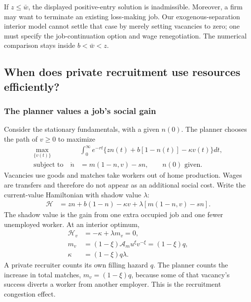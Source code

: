 If $z\leq\bar w$, the displayed positive-entry solution is inadmissible.
Moreover, a firm may want to terminate an existing loss-making job. Our
exogenous-separation interior model cannot settle that case by merely setting
vacancies to zero; one must specify the job-continuation option and wage
renegotiation. The numerical comparison stays inside $b<\bar w<z$.

\subsection{When does private recruitment use resources efficiently?}

\subsubsection{The planner values a job's social gain}

Consider the stationary fundamentals, with a given $n(0)$. The planner chooses
the path of $v\geq0$ to maximize
\begin{align}
 \max_{\{v(t)\}}\quad
 &\int_0^\infty e^{-rt}
   \{zn(t)+b[1-n(t)]-\kappa v(t)\}dt,\\
 \text{subject to}\quad
 \dot n&=m(1-n,v)-sn,\qquad n(0)\text{ given}.
\end{align}
Vacancies use goods and matches take workers out of home production. Wages
are transfers and therefore do not appear as an additional social cost.
Write the current-value Hamiltonian with shadow value $\lambda$:
\begin{align}
 \mathcal H
 &=zn+b(1-n)-\kappa v+\lambda[m(1-n,v)-sn].
\end{align}
The shadow value is the gain from one extra occupied job and one fewer
unemployed worker. At an interior optimum,
\begin{align}
 \mathcal H_v&=-\kappa+\lambda m_v=0,\\
 m_v&=(1-\xi)\mathcal A_m u^\xi v^{-\xi}=(1-\xi)q,\\
 \kappa&=(1-\xi)q\lambda.
 \label{eq:lm-planner-entry}
\end{align}
A private recruiter counts its own filling hazard $q$. The planner counts
the increase in total matches, $m_v=(1-\xi)q$, because some of that vacancy's
success diverts a worker from another employer. This is the recruitment
congestion effect.


